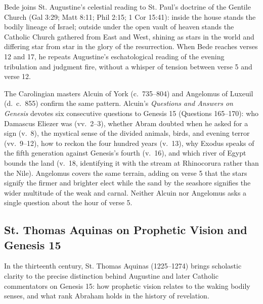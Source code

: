 Bede joins St. Augustine's celestial reading to St. Paul's doctrine of the Gentile Church (Gal 3:29; Matt 8:11; Phil 2:15; 1 Cor 15:41): inside the house stands the bodily lineage of Israel; outside under the open vault of heaven stands the Catholic Church gathered from East and West, shining as stars in the world and differing star from star in the glory of the resurrection. When Bede reaches verses 12 and 17, he repeats Augustine's eschatological reading of the evening tribulation and judgment fire, without a whisper of tension between verse 5 and verse 12.

The Carolingian masters Alcuin of York (c.~735--804) and Angelomus of Luxeuil (d.~c.~855) confirm the same pattern. Alcuin's \emph{Questions and Answers on Genesis} devotes six consecutive questions to Genesis 15 (Questions 165--170): who Damascus Eliezer was (vv.~2--3), whether Abram doubted when he asked for a sign (v.~8), the mystical sense of the divided animals, birds, and evening terror (vv.~9--12), how to reckon the four hundred years (v.~13), why Exodus speaks of the fifth generation against Genesis's fourth (v.~16), and which river of Egypt bounds the land (v.~18, identifying it with the stream at Rhinocorura rather than the Nile). Angelomus covers the same terrain, adding on verse 5 that the stars signify the firmer and brighter elect while the sand by the seashore signifies the wider multitude of the weak and carnal. Neither Alcuin nor Angelomus asks a single question about the hour of verse 5.

\subsection{St. Thomas Aquinas on Prophetic Vision and Genesis 15}

In the thirteenth century, St. Thomas Aquinas (1225--1274) brings scholastic clarity to the precise distinction behind Augustine and later Catholic commentators on Genesis 15: how prophetic vision relates to the waking bodily senses, and what rank Abraham holds in the history of revelation.

